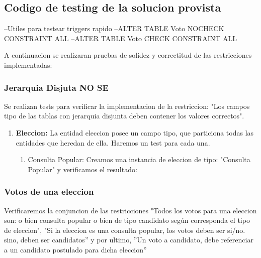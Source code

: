 \subsection{Codigo de testing de la solucion provista}
--Utiles para testear triggers rapido
--ALTER TABLE Voto NOCHECK CONSTRAINT ALL
--ALTER TABLE Voto CHECK CONSTRAINT ALL

A continuacion se realizaran pruebas de solidez y correctitud de las restricciones implementadas:

\subsubsection{Jerarquia Disjuta NO SE}

Se realizan tests para verificar la implementacion de la restriccion: "Los campos tipo de las tablas con jerarquia disjunta deben contener los valores correctos".

\begin{enumerate}

\item \textbf{Eleccion:} La entidad eleccion posee un campo tipo, que particiona todas las entidades que heredan
de ella. Haremos un test para cada una.

\begin{enumerate}

\item Consulta Popular: Creamos una instancia de eleccion de tipo: "Consulta Popular" y verificamos el
resultado:

\end{enumerate}

\end{enumerate}

\subsubsection{Votos de una eleccion}

Verificaremos la conjuncion de las restricciones "Todos los votos para una eleccion son: o bien consulta popular o bien de tipo candidato según corresponda el tipo de eleccion",  "Si la eleccion es una consulta popular, los votos deben ser si/no. sino, deben ser candidatos'' y por ultimo, ''Un voto a candidato, debe referenciar a un candidato postulado para dicha eleccion''

